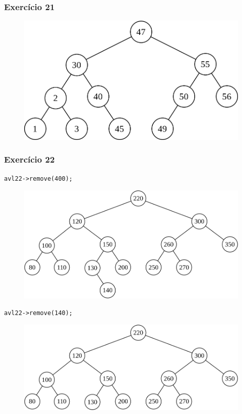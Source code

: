 \documentclass[aspectratio=169]{beamer}
\begin{document}
\begin{frame}[fragile]\frametitle{Exercício 21}
\begin{figure}[h]
	\centering
	\includegraphics[height=0.5\paperheight]{imagens/avl-exercicio21.png}
\end{figure}
\end{frame}

\begin{frame}[fragile]\frametitle{Exercício 22}
\texttt{avl22->remove(400);}
\begin{figure}[h]
	\centering
	\includegraphics[height=0.32\paperheight]{imagens/avl-exercicio22b.png}
\end{figure}
\texttt{avl22->remove(140);}
\begin{figure}[h]
	\centering
	\includegraphics[height=0.25\paperheight]{imagens/avl-exercicio22c.png}
\end{figure}
\end{frame}
\end{document}
